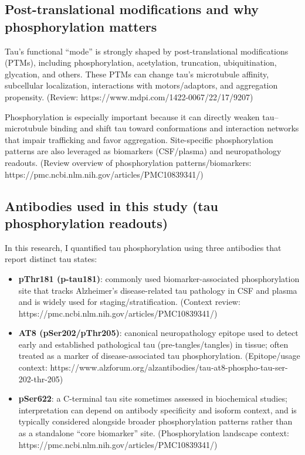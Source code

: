 \documentclass[
  letterpaper,
  DIV=11,
  numbers=noendperiod]{scrreprt}
\begin{document}
\subsection{Post-translational modifications and why phosphorylation
matters}\label{post-translational-modifications-and-why-phosphorylation-matters}

Tau's functional ``mode'' is strongly shaped by post-translational
modifications (PTMs), including phosphorylation, acetylation,
truncation, ubiquitination, glycation, and others. These PTMs can change
tau's microtubule affinity, subcellular localization, interactions with
motors/adaptors, and aggregation propensity. (Review:
https://www.mdpi.com/1422-0067/22/17/9207)

Phosphorylation is especially important because it can directly weaken
tau--microtubule binding and shift tau toward conformations and
interaction networks that impair trafficking and favor aggregation.
Site-specific phosphorylation patterns are also leveraged as biomarkers
(CSF/plasma) and neuropathology readouts. (Review overview of
phosphorylation patterns/biomarkers:
https://pmc.ncbi.nlm.nih.gov/articles/PMC10839341/)

\subsection{Antibodies used in this study (tau phosphorylation
readouts)}\label{antibodies-used-in-this-study-tau-phosphorylation-readouts}

In this research, I quantified tau phosphorylation using three
antibodies that report distinct tau states:

\begin{itemize}
\item
  \textbf{pThr181 (p-tau181)}: commonly used biomarker-associated
  phosphorylation site that tracks Alzheimer's disease-related tau
  pathology in CSF and plasma and is widely used for
  staging/stratification. (Context review:
  https://pmc.ncbi.nlm.nih.gov/articles/PMC10839341/)
\item
  \textbf{AT8 (pSer202/pThr205)}: canonical neuropathology epitope used
  to detect early and established pathological tau (pre-tangles/tangles)
  in tissue; often treated as a marker of disease-associated tau
  phosphorylation. (Epitope/usage context:
  https://www.alzforum.org/alzantibodies/tau-at8-phospho-tau-ser-202-thr-205)
\item
  \textbf{pSer622}: a C-terminal tau site sometimes assessed in
  biochemical studies; interpretation can depend on antibody specificity
  and isoform context, and is typically considered alongside broader
  phosphorylation patterns rather than as a standalone ``core
  biomarker'' site. (Phosphorylation landscape context:
  https://pmc.ncbi.nlm.nih.gov/articles/PMC10839341/)
\end{itemize}
\end{document}
